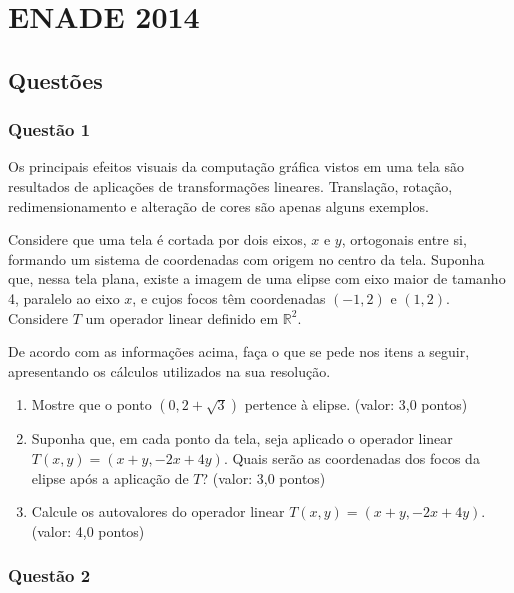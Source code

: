 \chapter{ENADE 2014}

\section{\color{blue} Quest\~oes}

\subsection{\color{blue} Quest\~ao 1}

Os principais efeitos visuais da computa\c c\~ao gr\'afica vistos em uma tela s\~ao resultados de aplica\c c\~oes de transforma\c c\~oes lineares. Transla\c c\~ao, rota\c c\~ao, redimensionamento e altera\c c\~ao de cores s\~ao apenas alguns exemplos.

Considere que uma tela \'e cortada por dois eixos, $x$ e $y$, ortogonais entre si, formando um sistema de coordenadas com origem no centro da tela. Suponha que, nessa tela plana, existe a imagem de uma elipse com eixo maior de tamanho 4, paralelo ao eixo $x$, e cujos focos t\^em coordenadas $(-1,2)$ e $(1,2)$. Considere $T$ um operador linear definido em $\mathbb R^2$.

De acordo com as informa\c c\~oes acima, fa\c ca o que se pede nos itens a seguir, apresentando os c\'alculos utilizados na sua resolu\c c\~ao.

\begin{enumerate}

\item[(a)] Mostre que o ponto $(0,2+\sqrt{3})$ pertence \`a elipse. (valor: 3,0 pontos)

\item[(b)] Suponha que, em cada ponto da tela, seja aplicado o operador linear $T(x,y)=(x+y,-2x+4y)$. Quais ser\~ao as coordenadas dos focos da elipse ap\'os a aplica\c c\~ao de $T$? (valor: 3,0 pontos)

\item[(c)] Calcule os autovalores do operador linear $T(x,y)=(x+y,-2x+4y)$. (valor: 4,0 pontos)

\end{enumerate}
\subsection{\color{blue} Quest\~ao 2}

